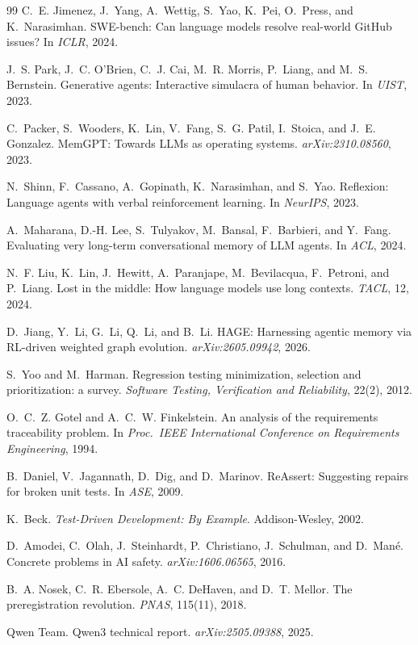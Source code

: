 \documentclass[11pt]{article}
\begin{document}
\begin{thebibliography}{99}
C.~E. Jimenez, J.~Yang, A.~Wettig, S.~Yao, K.~Pei, O.~Press, and
K.~Narasimhan.
\newblock SWE-bench: Can language models resolve real-world GitHub issues?
\newblock In \emph{ICLR}, 2024.

J.~S. Park, J.~C. O'Brien, C.~J. Cai, M.~R. Morris, P.~Liang, and
M.~S. Bernstein.
\newblock Generative agents: Interactive simulacra of human behavior.
\newblock In \emph{UIST}, 2023.

C.~Packer, S.~Wooders, K.~Lin, V.~Fang, S.~G. Patil, I.~Stoica, and
J.~E. Gonzalez.
\newblock MemGPT: Towards LLMs as operating systems.
\newblock \emph{arXiv:2310.08560}, 2023.

N.~Shinn, F.~Cassano, A.~Gopinath, K.~Narasimhan, and S.~Yao.
\newblock Reflexion: Language agents with verbal reinforcement learning.
\newblock In \emph{NeurIPS}, 2023.

A.~Maharana, D.-H. Lee, S.~Tulyakov, M.~Bansal, F.~Barbieri, and Y.~Fang.
\newblock Evaluating very long-term conversational memory of LLM agents.
\newblock In \emph{ACL}, 2024.

N.~F. Liu, K.~Lin, J.~Hewitt, A.~Paranjape, M.~Bevilacqua, F.~Petroni, and
P.~Liang.
\newblock Lost in the middle: How language models use long contexts.
\newblock \emph{TACL}, 12, 2024.

D.~Jiang, Y.~Li, G.~Li, Q.~Li, and B.~Li.
\newblock HAGE: Harnessing agentic memory via RL-driven weighted graph
evolution.
\newblock \emph{arXiv:2605.09942}, 2026.

S.~Yoo and M.~Harman.
\newblock Regression testing minimization, selection and prioritization: a
survey.
\newblock \emph{Software Testing, Verification and Reliability}, 22(2), 2012.

O.~C.~Z. Gotel and A.~C.~W. Finkelstein.
\newblock An analysis of the requirements traceability problem.
\newblock In \emph{Proc.\ IEEE International Conference on Requirements
Engineering}, 1994.

B.~Daniel, V.~Jagannath, D.~Dig, and D.~Marinov.
\newblock ReAssert: Suggesting repairs for broken unit tests.
\newblock In \emph{ASE}, 2009.

K.~Beck.
\newblock \emph{Test-Driven Development: By Example}.
\newblock Addison-Wesley, 2002.

D.~Amodei, C.~Olah, J.~Steinhardt, P.~Christiano, J.~Schulman, and D.~Man\'e.
\newblock Concrete problems in AI safety.
\newblock \emph{arXiv:1606.06565}, 2016.

B.~A. Nosek, C.~R. Ebersole, A.~C. DeHaven, and D.~T. Mellor.
\newblock The preregistration revolution.
\newblock \emph{PNAS}, 115(11), 2018.

Qwen Team.
\newblock Qwen3 technical report.
\newblock \emph{arXiv:2505.09388}, 2025.
\end{thebibliography}
\end{document}
